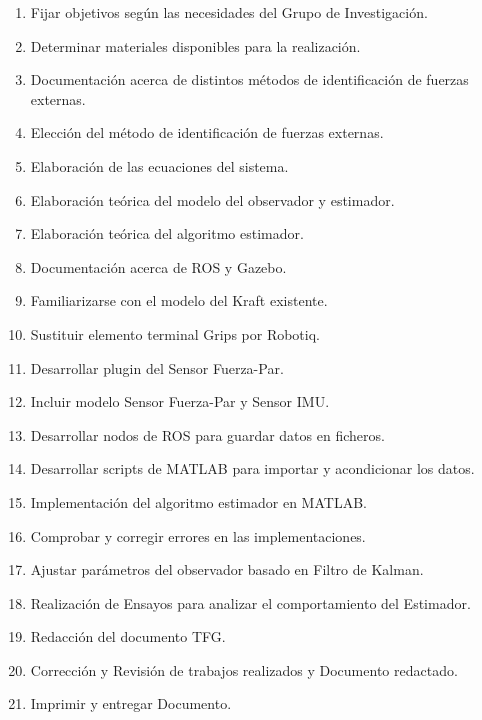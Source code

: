 \begin{enumerate}

\item Fijar objetivos según las necesidades del Grupo de Investigación.

\item Determinar materiales disponibles para la realización.

\item Documentación acerca de distintos métodos de identificación de fuerzas externas.

\item Elección del método de identificación de fuerzas externas.

\item Elaboración de las ecuaciones del sistema.

\item Elaboración teórica del modelo del observador y estimador.

\item Elaboración teórica del algoritmo estimador.

\item Documentación acerca de ROS y Gazebo.

\item Familiarizarse con el modelo del Kraft existente.

\item Sustituir elemento terminal Grips por Robotiq.

\item Desarrollar plugin del Sensor Fuerza-Par.

\item Incluir modelo Sensor Fuerza-Par y Sensor IMU.

\item Desarrollar nodos de ROS para guardar datos en ficheros.

\item Desarrollar scripts de MATLAB para importar y acondicionar los datos.

\item Implementación del algoritmo estimador en MATLAB.

\item Comprobar y corregir errores en las implementaciones.

\item Ajustar parámetros del observador basado en Filtro de Kalman.

\item Realización de Ensayos para analizar el comportamiento del Estimador.

\item Redacción del documento TFG.

\item Corrección y Revisión de trabajos realizados y Documento redactado.

\item Imprimir y entregar Documento.

\end{enumerate}

